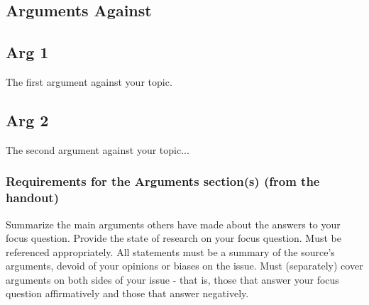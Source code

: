\documentclass[11pt]{article}
\begin{document}
\begin{multicols}{2}
\section{Arguments Against}
\subsection{Arg 1}
The first argument against your topic.
\subsection{Arg 2}
The second argument against your topic...

\subsubsection*{Requirements for the Arguments section(s) (from the handout)}
Summarize the main arguments others have made about the answers to your focus question. Provide the state of research on your focus question. Must be referenced appropriately.  All statements must be a summary of the source's arguments, devoid of your opinions or biases on the issue. Must (separately) cover arguments on both sides of your issue - that is, those that answer your focus question affirmatively and those that answer negatively. \cite{handout}


\end{multicols}
\end{document}
